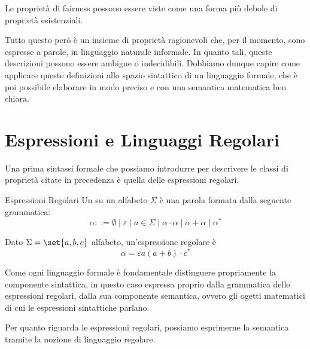 \begin{note}{}
  Le proprietà di fairness possono essere viste come una forma più debole di proprietà esistenziali.
\end{note}

Tutto questo però è un insieme di proprietà ragionevoli che, per il momento, sono espresse a parole, in linguaggio naturale informale. In quanto tali, queste descrizioni possono essere ambigue o indecidibili. Dobbiamo dunque capire come applicare queste definizioni allo spazio sintattico di un linguaggio formale, che è poi possibile elaborare in modo preciso e con una semantica matematica ben chiara.

\section{Espressioni e Linguaggi Regolari}

Una prima sintassi formale che possiamo introdurre per descrivere le classi di proprietà citate in precedenza è quella delle espressioni regolari.

\begin{definition}{Espressioni Regolari}
  Un  su un alfabeto \(\Sigma\) è una parola formata dalla seguente grammatica:
  \[\alpha ::= \emptyset \mid \varepsilon \mid a \in \Sigma \mid \alpha \cdot \alpha \mid \alpha + \alpha \mid \alpha^* \]
\end{definition}

\begin{example}{}
  Dato \(\Sigma = \set{a,b,c}\) alfabeto, un'espressione regolare è
  \[\alpha = \varepsilon a (a+b)\cdot c^* \]
\end{example}

Come ogni linguaggio formale è fondamentale distinguere propriamente la componente sintattica, in questo caso espressa proprio dalla grammatica delle espressioni regolari, dalla sua componente semantica, ovvero gli ogetti matematici di cui le espressioni sintattiche parlano.

Per quanto riguarda le espressioni regolari, possiamo esprimerne la semantica tramite la nozione di linguaggio regolare.

